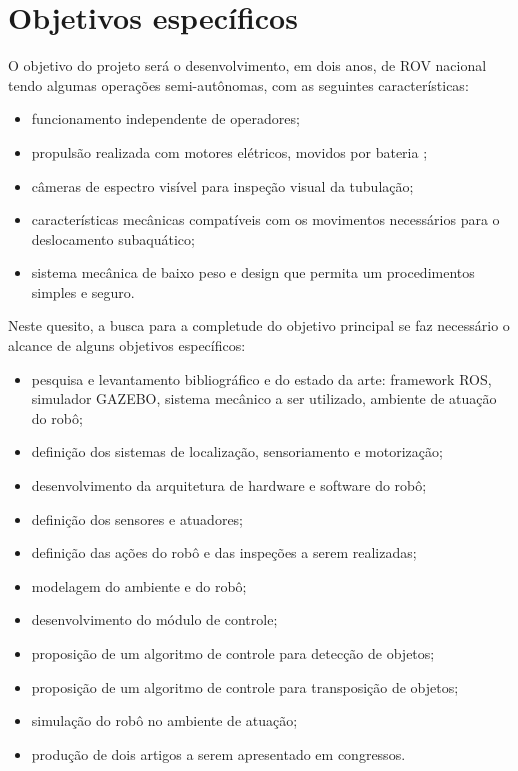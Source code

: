 \section{Objetivos específicos}
O objetivo do projeto será o desenvolvimento, em dois anos, de ROV nacional tendo algumas operações semi-autônomas, com as seguintes características:
\begin{itemize}
\item funcionamento independente de operadores;
\item propulsão realizada com motores elétricos, movidos por bateria	;
\item câmeras de espectro visível para inspeção visual da tubulação;
\item características mecânicas compatíveis com os movimentos necessários para o deslocamento subaquático;
\item sistema mecânica de baixo peso e design que permita um procedimentos simples e seguro.
\end{itemize}

\noindent Neste quesito, a busca para a completude do objetivo principal se faz necessário o alcance de alguns objetivos específicos:
\begin{itemize}
\item pesquisa e levantamento bibliográfico e do estado da arte: framework ROS, simulador GAZEBO, sistema mecânico a ser utilizado, ambiente de atuação do robô;
\item definição dos sistemas de localização, sensoriamento e motorização;
\item desenvolvimento da arquitetura de hardware e software do robô;
\item definição dos sensores e atuadores;
\item definição das ações do robô e das inspeções a serem realizadas;
\item modelagem do ambiente e do robô;
\item desenvolvimento do módulo de controle;
\item proposição de um algoritmo de controle para detecção de objetos;
\item proposição de um algoritmo de controle para transposição de objetos;
\item simulação do robô no ambiente de atuação;
\item produção de dois artigos a serem apresentado em congressos.
\end{itemize}














